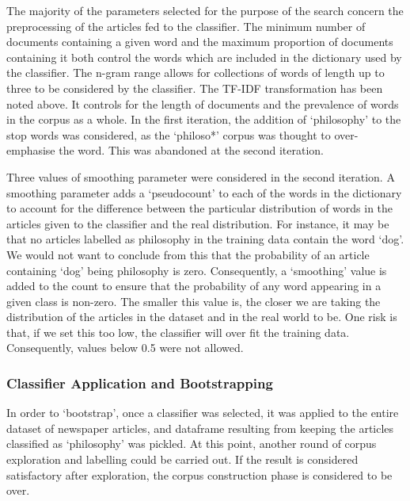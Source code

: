 \documentclass{article}
\begin{document}
The majority of the parameters selected for the purpose of the search concern the preprocessing of the articles fed to the classifier. The minimum number of documents containing a given word and the maximum proportion of documents containing it both control the words which are included in the dictionary used by the classifier. The n-gram range allows for collections of words of length up to three to be considered by the classifier. The TF-IDF transformation has been noted above. It controls for the length of documents and the prevalence of words in the corpus as a whole. In the first iteration, the addition of `philosophy' to the stop words was considered, as the `philoso*' corpus was thought to over-emphasise the word. This was abandoned at the second iteration.

Three values of smoothing parameter were considered in the second iteration. A smoothing parameter adds a `pseudocount' to each of the words in the dictionary to account for the difference between the particular distribution of words in the articles given to the classifier and the real distribution. For instance, it may be that no articles labelled as philosophy in the training data contain the word `dog'. We would not want to conclude from this that the probability of an article containing `dog' being philosophy is zero. Consequently, a `smoothing' value is added to the count to ensure that the probability of any word appearing in a given class is non-zero. The smaller this value is, the closer we are taking the distribution of the articles in the dataset and in the real world to be. One risk is that, if we set this too low, the classifier will over fit the training data. Consequently, values below 0.5 were not allowed.

\subsubsection{Classifier Application and Bootstrapping}

In order to `bootstrap', once a classifier was selected, it was applied to the entire dataset of newspaper articles, and dataframe resulting from keeping the articles classified as `philosophy' was pickled. At this point, another round of corpus exploration and labelling could be carried out. If the result is considered satisfactory after exploration, the corpus construction phase is considered to be over.
\end{document}
